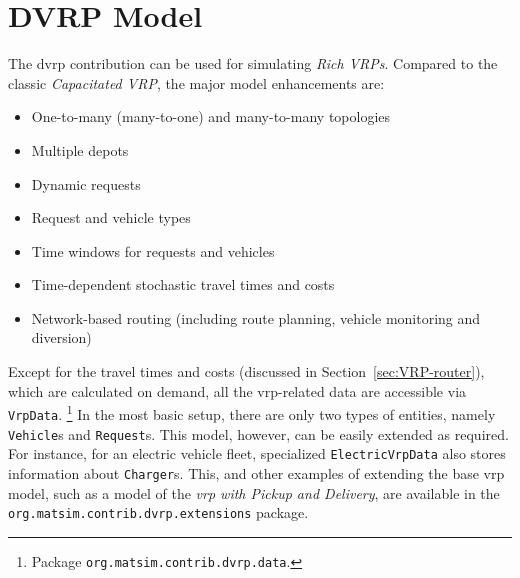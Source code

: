 \section{DVRP Model}
\label{sec:DVRP_model}
The \gls{dvrp} contribution can be used for simulating \emph{Rich VRPs}. Compared to the classic \emph{Capacitated VRP}, the major model enhancements are:
%
\begin{itemize}\styleItemize
	\item One-to-many (many-to-one) and many-to-many topologies
	\item Multiple depots
	\item Dynamic requests
	\item Request and vehicle types
	\item Time windows for requests and vehicles
	\item Time-dependent stochastic travel times and costs
	\item Network-based routing (including route planning, vehicle monitoring and diversion)
\end{itemize}
%
Except for the travel times and costs (discussed in Section~\ref{sec:VRP-router}), which are calculated on demand, all the \gls{vrp}-related data are accessible via \lstinline$VrpData$.%
\footnote{
Package \lstinline$org.matsim.contrib.dvrp.data$.
}
In the most basic setup, there are only two types of entities, namely \lstinline$Vehicle$s and \lstinline$Request$s. This model, however, can be easily extended as required. For instance, for an electric vehicle fleet, specialized \lstinline$ElectricVrpData$ also stores information about \lstinline$Charger$s. This, and other examples of extending the base \gls{vrp} model, such as a model of the \emph{\gls{vrp} with Pickup and Delivery}, are available in the \lstinline$org.matsim.contrib.dvrp.extensions$ package.

